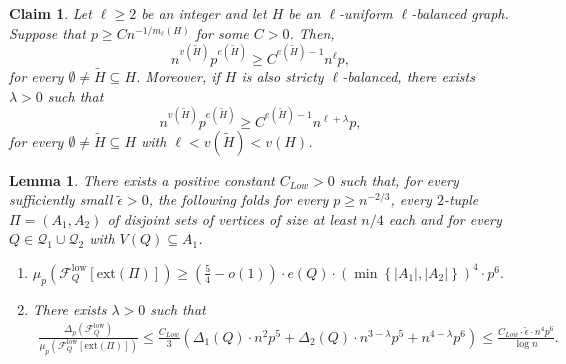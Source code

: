 \documentclass[10pt,a4paper]{amsart}
\newtheorem{claim}{Claim}
\newtheorem{lemma}{Lemma}
\newcommand{\cF}{\mathcal{F}}
\newcommand{\cFQL}{\cF_Q^{\mathrm{low}}}
\newcommand{\cQ}{\mathcal{Q}}
\newcommand{\ext}{\mathrm{ext}}
\renewcommand{\ge}{\geqslant}
\renewcommand{\le}{\leqslant}
\begin{document}
\begin{claim}\label{claim:strictly-balanced}
    Let $\ell \ge 2$ be an integer and let $H$ be an $\ell$-uniform $\ell$-balanced graph. Suppose that $p \ge C n^{-1/m_\ell(H)}$ for some $C > 0$. Then,
    \[
        n^{v(\tilde{H})} p^{e(\tilde{H})} \ge C^{e(\tilde{H}) - 1} n^{\ell} p,
    \]
    for every $\emptyset \neq \tilde{H} \subseteq H$. Moreover, if $H$ is also stricty $\ell$-balanced, there exists $\lambda > 0$ such that 
    \[
        n^{v(\tilde{H})} p^{e(\tilde{H})} \ge C^{e(\tilde{H}) - 1} n^{\ell + \lambda} p,
    \]
    for every $\emptyset \neq \tilde{H} \subseteq H$ with $\ell < v(\tilde{H}) < v(H)$.
\end{claim}

\begin{lemma}\label{lemma:mu-Delta-bounds-low-degree}
    There exists a positive constant $C_{Low} > 0$ such that, for every sufficiently small $\tilde{\epsilon} > 0$, the following folds for every $p \ge n^{-2/3}$, every $2$-tuple $\Pi = (A_1, A_2)$ of disjoint sets of vertices of size at least $n/4$ each and for every $Q \in \cQ_1 \cup \cQ_2$ with $V(Q) \subseteq A_1$.
    \begin{enumerate}
        \item $\mu_p\left(\cFQL[\ext(\Pi)]\right) \ge \left(\frac{5}{4} - o(1)\right) \cdot e(Q) \cdot \left(\min\left\{|A_1|, |A_2|\right\}\right)^{4} \cdot p^6.$
        \item There exists $\lambda > 0$ such that 
        \begin{align*}
            \frac{\Delta_p\left(\cFQL\right)}{\mu_p\left(\cFQL[\ext(\Pi)]\right)} \le \frac{C_{Low}}{3}\left(\Delta_1(Q) \cdot n^{2} p^{5} + \Delta_2(Q) \cdot n^{3 - \lambda} p^{5} + n^{4 - \lambda} p^{6}\right) \le \frac{C_{Low} \cdot \tilde{\epsilon} \cdot n^4 p^6}{\log n}.
        \end{align*}
    \end{enumerate}
\end{lemma}
\end{document}

